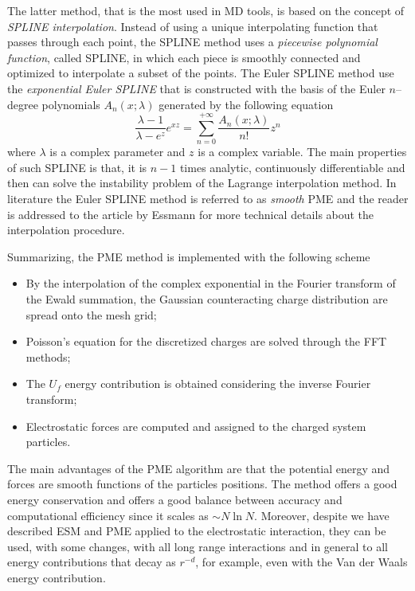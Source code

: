 The latter method, that is the most used in \ac{MD} tools, is based on the concept of \textit{SPLINE
interpolation}. Instead of using a unique interpolating function that passes through each point, the SPLINE
method uses a \textit{piecewise polynomial function}, called SPLINE, in which each piece is smoothly connected
and optimized to interpolate a subset of the points. The Euler SPLINE method use the \textit{exponential Euler
SPLINE} that is constructed with the basis of the Euler $n$--degree polynomials $A_n(x;\lambda)$ generated by the
following equation
\begin{equation*}
	\frac{\lambda - 1}{\lambda - e^z}e^{xz} = \sum_{n=0}^{+\infty} \frac{A_n(x;\lambda)}{n!}z^n
\end{equation*}
where $\lambda$ is a complex parameter and $z$ is a complex variable. The main properties of such SPLINE is that,
it is $n-1$ times analytic, continuously differentiable and then can solve the instability problem of the
Lagrange interpolation method. In literature the Euler SPLINE method is referred to as \textit{smooth} \ac{PME}
and the reader is addressed to the article by Essmann \etal \cite{EssmannSPME} for more technical details about
the interpolation procedure.

Summarizing, the \ac{PME} method is implemented with the following scheme
\begin{itemize}
	\item By the interpolation of the complex exponential in the Fourier transform of the Ewald summation, the
		  Gaussian counteracting charge distribution are spread onto the mesh grid;%
	\item Poisson's equation for the discretized charges are solved through the \ac{FFT} methods;
	\item The $U_f$ energy contribution is obtained considering the inverse Fourier transform;
	\item Electrostatic forces are computed and assigned to the charged system particles.
\end{itemize}

The main advantages of the \ac{PME} algorithm are that the potential energy and forces are smooth functions of
the particles positions. The method offers a good energy conservation and offers a good balance between accuracy
and computational efficiency since it scales as $\sim N\ln N$. Moreover, despite we have described \ac{ESM} and
\ac{PME} applied to the electrostatic interaction, they can be used, with some changes, with all long range
interactions and in general to all energy contributions that decay as $r^{-d}$, for example, even with the Van
der Waals energy contribution.

